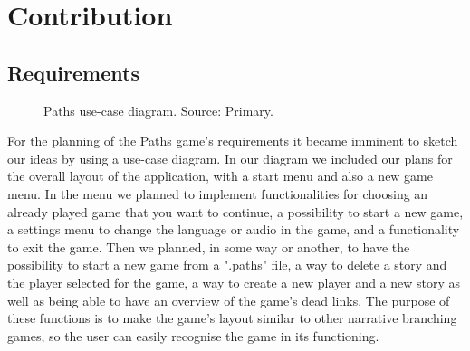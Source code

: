\documentclass[British]{article}
\begin{document}
\newpage
\section{Contribution}
\subsection{Requirements}

\begin{figure}
\centering
{}
    \caption
    {Paths use-case diagram. Source: Primary.}
\end{figure}
For the planning of the Paths game's requirements it became imminent to sketch our ideas by using a use-case diagram. In our diagram we included our plans for the overall layout of the application, with a start menu and also a new game menu. In the menu we planned to implement functionalities for choosing an already played game that you want to continue, a possibility to start a new game, a settings menu to change the language or audio in the game, and a functionality to exit the game. Then we planned, in some way or another, to have the possibility to start a new game from a ".paths" file, a way to delete a story and the player selected for the game, a way to create a new player and a new story as well as being able to have an overview of the game's dead links. The purpose of these functions is to make the game's layout similar to other narrative branching games, so the user can easily recognise the game in its functioning. 
\end{document}
